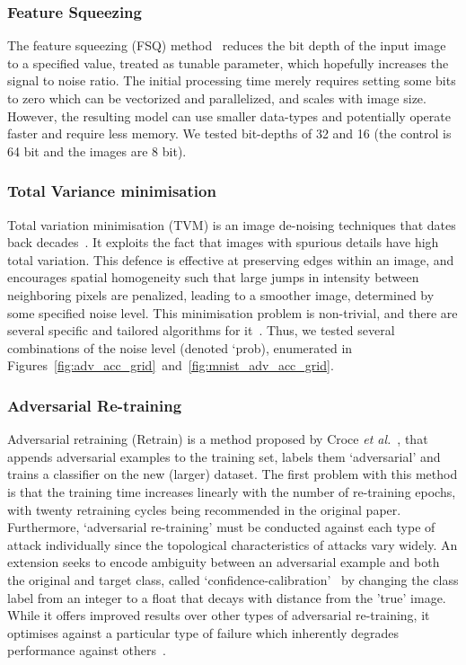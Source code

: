 \subsubsection{Feature Squeezing}
The feature squeezing (FSQ) method~\cite{feature_squeezing} reduces the bit depth of the input image to a specified value, treated as tunable parameter, which hopefully increases the signal to noise ratio.
The initial processing time merely requires setting some bits to zero which can be vectorized and parallelized, and scales with image size.
However, the resulting model can use smaller data-types and potentially operate faster and require less memory.
We tested bit-depths of 32 and 16 (the control is 64 bit and the images are 8 bit).

\subsubsection{Total Variance minimisation}
Total variation minimisation (TVM) is an image de-noising techniques that dates back decades~\cite{rudin1992nonlinear}.
It exploits the fact that images with spurious details have high total variation.
This defence is effective at preserving edges within an image, and encourages spatial homogeneity such that large jumps in intensity between neighboring pixels are penalized, leading to a smoother image, determined by some specified noise level.
This minimisation problem is non-trivial, and there are several specific and tailored algorithms for it~\cite{chambolle2004algorithm,hadj2018continuation}.
Thus, we tested several combinations of the noise level (denoted `prob),  enumerated in Figures~\ref{fig:adv_acc_grid}~and~\ref{fig:mnist_adv_acc_grid}.

\subsubsection{Adversarial Re-training}
Adversarial retraining (Retrain) is a method proposed by Croce \textit{et al.}~\cite{tsipras_robustness_2019}, that appends adversarial examples to the training set, labels them `adversarial' and trains a classifier on the new (larger) dataset.
The first problem with this method is that the training time increases linearly with the number of re-training epochs, with twenty retraining cycles being recommended in the original paper.
Furthermore, `adversarial re-training' must be conducted against each type of attack individually since the topological characteristics of attacks vary widely.
An extension seeks to encode ambiguity between an adversarial example and both the original and target class, called `confidence-calibration'~\cite{croce_reliable_2020} by changing the class label from an integer to a float that decays with distance from the 'true' image.
While it offers improved results over other types of adversarial re-training, it optimises against a particular type of failure which inherently degrades performance against others~\cite{carlini_towards_2017}.

